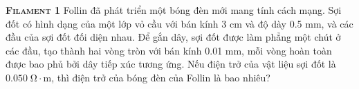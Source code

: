 
\begin{problem}{\textbf{\textsc{Filament 1}}\hspace{1mm}}
	Follin đã phát triển một bóng đèn mới mang tính cách mạng. Sợi đốt có hình dạng của một lớp vỏ cầu với bán kính 3 cm và độ dày 0.5 mm, và các đầu của sợi đốt đối diện nhau. Để gắn dây, sợi đốt được làm phẳng một chút ở các đầu, tạo thành hai vòng tròn với bán kính 0.01 mm, mỗi vòng hoàn toàn được bao phủ bởi dây tiếp xúc tương ứng. Nếu điện trở của vật liệu sợi đốt là $0.050\;\mathrm{\Omega\cdot m}$, thì điện trở của bóng đèn của Follin là bao nhiêu?
\end{problem}